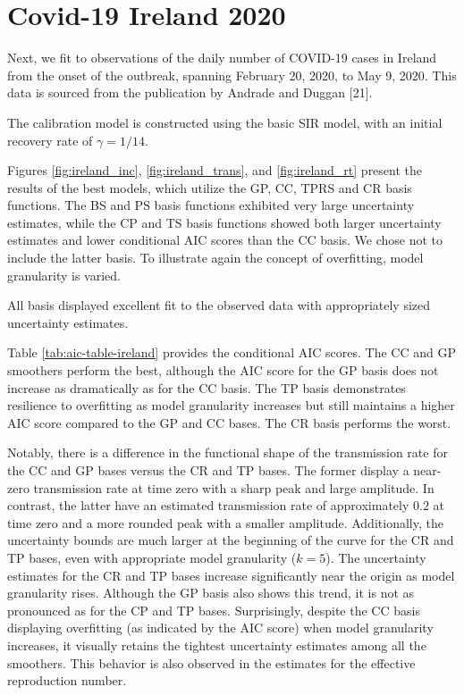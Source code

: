 \documentclass[
11pt, %
oneside, %
english, %
singlespacing, %
]{macthesis} %
\begin{document}
\section{Covid-19 Ireland 2020}\label{Ireland}

Next, we fit to observations of the daily number of COVID-19 cases in Ireland from the onset of the outbreak, spanning February 20, 2020, to May 9, 2020. This data is sourced from the publication by Andrade and Duggan {[}21{]}.

The calibration model is constructed using the basic SIR model, with an initial recovery rate of \(\gamma = 1/14\).

Figures \ref{fig:ireland_inc}, \ref{fig:ireland_trans}, and \ref{fig:ireland_rt} present the results of the best models, which utilize the GP, CC, TPRS and CR basis functions. The BS and PS basis functions exhibited very large uncertainty estimates, while the CP and TS basis functions showed both larger uncertainty estimates and lower conditional AIC scores than the CC basis. We chose not to include the latter basis. To illustrate again the concept of overfitting, model granularity is varied.

All basis displayed excellent fit to the observed data with appropriately sized uncertainty estimates.

Table \ref{tab:aic-table-ireland} provides the conditional AIC scores. The CC and GP smoothers perform the best, although the AIC score for the GP basis does not increase as dramatically as for the CC basis. The TP basis demonstrates resilience to overfitting as model granularity increases but still maintains a higher AIC score compared to the GP and CC bases. The CR basis performs the worst.

Notably, there is a difference in the functional shape of the transmission rate for the CC and GP bases versus the CR and TP bases. The former display a near-zero transmission rate at time zero with a sharp peak and large amplitude. In contrast, the latter have an estimated transmission rate of approximately \(0.2\) at time zero and a more rounded peak with a smaller amplitude. Additionally, the uncertainty bounds are much larger at the beginning of the curve for the CR and TP bases, even with appropriate model granularity (\(k=5\)). The uncertainty estimates for the CR and TP bases increase significantly near the origin as model granularity rises. Although the GP basis also shows this trend, it is not as pronounced as for the CP and TP bases. Surprisingly, despite the CC basis displaying overfitting (as indicated by the AIC score) when model granularity increases, it visually retains the tightest uncertainty estimates among all the smoothers. This behavior is also observed in the estimates for the effective reproduction number.
\end{document}
